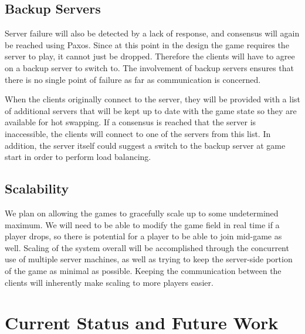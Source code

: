 \documentclass{sig-alternate}
\begin{document}
\subsection{Backup Servers}

Server failure will also be detected by a lack of response, and consensus
will again be reached using Paxos.  Since at this point in the design the
game requires the server to play, it cannot just be dropped.  Therefore the
clients will have to agree on a backup server to switch to.  The
involvement of backup servers ensures that there is no single point of
failure as far as communication is concerned.

When the clients originally connect to the server, they will be provided
with a list of additional servers that will be kept up to date with the
game state so they are available for hot swapping.  If a consensus is
reached that the server is inaccessible, the clients will connect to one of
the servers from this list.  In addition, the server itself could suggest a
switch to the backup server at game start in order to perform load
balancing.

\subsection{Scalability}

We plan on allowing the games to gracefully scale up to some undetermined
maximum.  We will need to be able to modify the game field in real time if
a player drops, so there is potential for a player to be able to join
mid-game as well.   Scaling of the system overall will be accomplished
through the concurrent use of multiple server machines, as well as trying
to keep the server-side portion of the game as minimal as possible.
Keeping the communication between the clients will inherently make scaling
to more players easier.




\section{Current Status and Future Work}
\label{current status}
\end{document}
